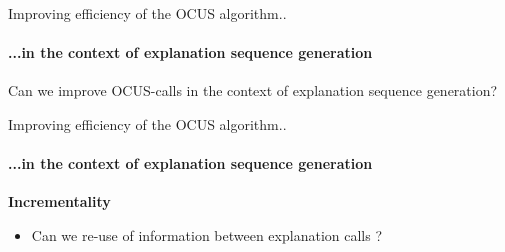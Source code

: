 \documentclass{beamer}
\renewcommand\emph[1]{{\color{vuborange}#1}}
\begin{document}
						\begin{frame}{Improving efficiency of the OCUS algorithm..}
				\framesubtitle{...in the context of explanation sequence generation}
							\begin{center}
	\large
	Can we \emph{improve} OCUS-calls in the context of explanation \emph{sequence} generation?
\end{center}
			\end{frame}
		
						\begin{frame}{Improving efficiency of the OCUS algorithm..}
			\framesubtitle{...in the context of explanation sequence generation}
			
			\textbf{Incrementality}
			\begin{itemize}
				\item Can we re-use of information between explanation calls ?
			\end{itemize}\vfill
		

		\end{frame}
	
\end{document}
